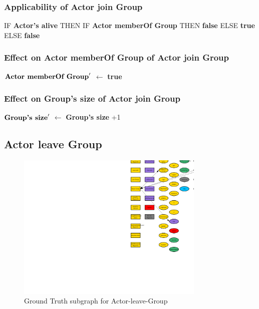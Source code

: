\documentclass{article}%
\begin{document}
%
\subsubsection{Applicability of Actor join Group}%
\label{ssubsec:Applicability of Actor join Group}%
\begin{flushleft}%
IF %
\textbf{Actor's alive}%
\linebreak%
\hspace*{2em}%
THEN %
IF %
\textbf{Actor memberOf Group}%
\linebreak%
\hspace*{4em}%
THEN %
\textbf{false}%
\linebreak%
\hspace*{4em}%
ELSE %
\textbf{true}%
\linebreak%
\hspace*{2em}%
ELSE %
\textbf{false}%
\end{flushleft}

%
\subsubsection{Effect on Actor memberOf Group of Actor join Group}%
\label{ssubsec:Effect on Actor memberOf Group of Actor join Group}%
\begin{flushleft}%
$\mbox{\textbf{Actor memberOf Group}} '$%
$\leftarrow$%
\textbf{true}%
\end{flushleft}

%
\subsubsection{Effect on Group's size of Actor join Group}%
\label{ssubsec:Effect on Group's size of Actor join Group}%
\begin{flushleft}%
$\mbox{\textbf{Group's size}} '$%
$\leftarrow$%
\textbf{Group's size}%
+1%
\end{flushleft}

%
\subsection{Actor leave Group}%
\label{subsec:Actor leave Group}%


\begin{figure}[ht]%
\centering%
\includegraphics[width=0.8\textwidth]{images/Actor-leave-Group.png}%
\caption{Ground Truth subgraph for Actor{-}leave{-}Group}%
\end{figure}
\end{document}
